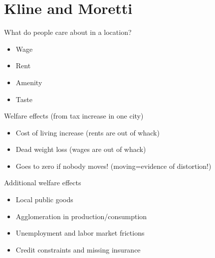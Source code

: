 \documentclass[12pt]{article}
\begin{document}
\section*{Kline and Moretti}

What do people care about in a location?

\begin{itemize}
	\item Wage
	\item Rent
	\item Amenity
	\item Taste
\end{itemize}

\noindent Welfare effects (from tax increase in one city)

\begin{itemize}
	\item Cost of living increase (rents are out of whack)
	\item Dead weight loss (wages are out of whack)
	\item Goes to zero if nobody moves! (moving=evidence of distortion!)
\end{itemize}

\noindent Additional welfare effects

\begin{itemize}
	\item Local public goods
	\item Agglomeration in production/consumption 
	\item Unemployment and labor market frictions
	\item Credit constraints and missing insurance
\end{itemize}
\end{document}
